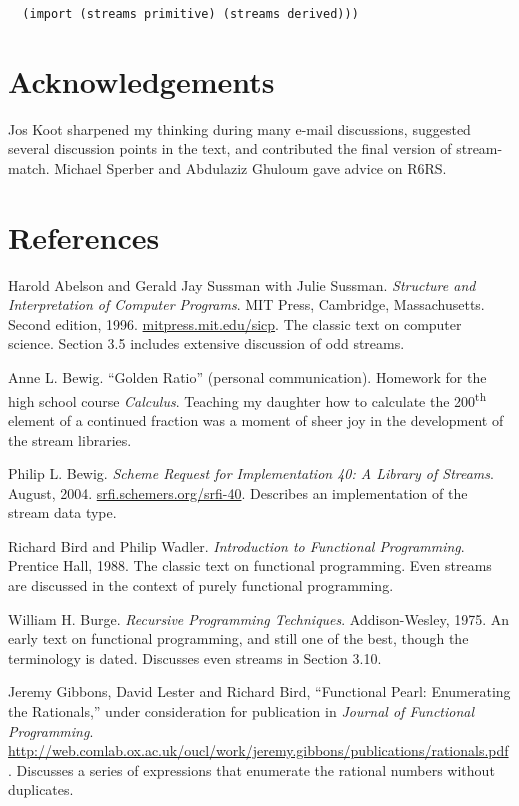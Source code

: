 \begin{verbatim}
  (import (streams primitive) (streams derived)))
\end{verbatim}

\section{Acknowledgements}\label{acknowledgements}

Jos Koot sharpened my thinking during many e-mail discussions, suggested
several discussion points in the text, and contributed the final version
of stream-match. Michael Sperber and Abdulaziz Ghuloum gave advice on
R6RS.

\section{References}\label{references}

Harold Abelson and Gerald Jay Sussman with Julie Sussman.
\emph{Structure and Interpretation of Computer Programs}. MIT Press,
Cambridge, Massachusetts. Second edition, 1996.
\href{http://mitpress.mit.edu/sicp}{mitpress.mit.edu/sicp}. The classic
text on computer science. Section 3.5 includes extensive discussion of
odd streams.

Anne L. Bewig. ``Golden Ratio'' (personal communication). Homework for
the high school course \emph{Calculus}. Teaching my daughter how to
calculate the 200\textsuperscript{th} element of a continued fraction
was a moment of sheer joy in the development of the stream libraries.

Philip L. Bewig. \emph{Scheme Request for Implementation 40: A Library
of Streams}. August, 2004.
\href{http://srfi.schemers.org/srfi-40}{srfi.schemers.org/srfi-40}.
Describes an implementation of the stream data type.

Richard Bird and Philip Wadler. \emph{Introduction to Functional
Programming}. Prentice Hall, 1988. The classic text on functional
programming. Even streams are discussed in the context of purely
functional programming.

William H. Burge. \emph{Recursive Programming Techniques}.
Addison-Wesley, 1975. An early text on functional programming, and still
one of the best, though the terminology is dated. Discusses even streams
in Section 3.10.

Jeremy Gibbons, David Lester and Richard Bird, ``Functional Pearl:
Enumerating the Rationals,'' under consideration for publication in
\emph{Journal of Functional Programming}.
\url{http://web.comlab.ox.ac.uk/oucl/work/jeremy.gibbons/publications/rationals.pdf}.
Discusses a series of expressions that enumerate the rational numbers
without duplicates.

